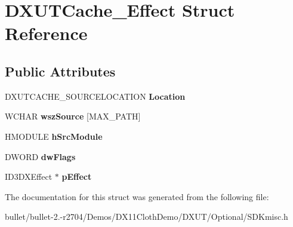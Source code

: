 \hypertarget{struct_d_x_u_t_cache___effect}{\section{D\+X\+U\+T\+Cache\+\_\+\+Effect Struct Reference}
\label{struct_d_x_u_t_cache___effect}
}
\subsection*{Public Attributes}
\begin{DoxyCompactItemize}
\item 
\hypertarget{struct_d_x_u_t_cache___effect_aab729cdf923009665f4fcd973f9e27b3}{D\+X\+U\+T\+C\+A\+C\+H\+E\+\_\+\+S\+O\+U\+R\+C\+E\+L\+O\+C\+A\+T\+I\+O\+N {\bfseries Location}}\label{struct_d_x_u_t_cache___effect_aab729cdf923009665f4fcd973f9e27b3}

\item 
\hypertarget{struct_d_x_u_t_cache___effect_a3b8d57991e52fa9ec6f91cf5d94b462c}{W\+C\+H\+A\+R {\bfseries wsz\+Source} \mbox{[}M\+A\+X\+\_\+\+P\+A\+T\+H\mbox{]}}\label{struct_d_x_u_t_cache___effect_a3b8d57991e52fa9ec6f91cf5d94b462c}

\item 
\hypertarget{struct_d_x_u_t_cache___effect_aee7a31cf568cb76010fcaae9b584ec1c}{H\+M\+O\+D\+U\+L\+E {\bfseries h\+Src\+Module}}\label{struct_d_x_u_t_cache___effect_aee7a31cf568cb76010fcaae9b584ec1c}

\item 
\hypertarget{struct_d_x_u_t_cache___effect_a4e62f6d5c595fbb5a26dae587ddcfdfb}{D\+W\+O\+R\+D {\bfseries dw\+Flags}}\label{struct_d_x_u_t_cache___effect_a4e62f6d5c595fbb5a26dae587ddcfdfb}

\item 
\hypertarget{struct_d_x_u_t_cache___effect_a6783ea0da06d165ef3a7de16b0ba3aad}{I\+D3\+D\+X\+Effect $\ast$ {\bfseries p\+Effect}}\label{struct_d_x_u_t_cache___effect_a6783ea0da06d165ef3a7de16b0ba3aad}

\end{DoxyCompactItemize}


The documentation for this struct was generated from the following file\+:\begin{DoxyCompactItemize}
\item 
bullet/bullet-\/2.-\/r2704/\+Demos/\+D\+X11\+Cloth\+Demo/\+D\+X\+U\+T/\+Optional/S\+D\+Kmisc.\+h\end{DoxyCompactItemize}
